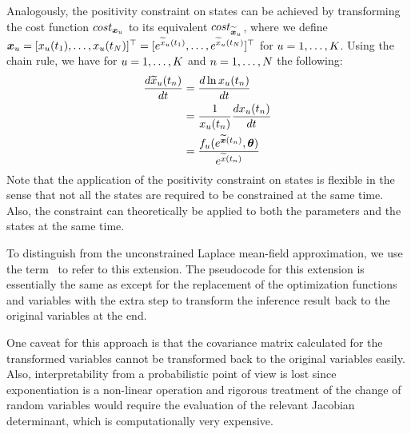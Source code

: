 Analogously, the positivity constraint on states can be achieved by transforming the cost function $cost_{\boldsymbol{x}_{u}}$ to its equivalent $cost_{\boldsymbol{\widetilde{x}}_{u}}$, where we define $\boldsymbol{x}_{u} = [x_{u}(t_{1}),\dots,x_{u}(t_{N})]^\top = [e^{\widetilde{x}_{u}(t_{1})},\dots,e^{\widetilde{x}_{u}(t_{N})}]^\top$ for $u = 1,\dots,K$.
Using the chain rule, we have for $u = 1,\dots,K$ and $n = 1,\dots,N$ the following:
\begin{align}
    \frac{d\widetilde{x}_{u}(t_n)}{dt}
    & =
    \frac{d\ln{{x}_{u}(t_n)}}{dt}
    \nonumber
    \\
    & =
    \frac{1}{{x}_{u}(t_n)}\frac{d{x}_{u}(t_n)}{dt}
    \nonumber
    \\
    & =  
    \frac{
        f_{u}(
        e^{\boldsymbol{\widetilde{x}}(t_n)}, \boldsymbol{\theta})}{e^{\widetilde{x}(t_n)}}
\end{align}
Note that the application of the positivity constraint on states is flexible in the sense that not all the states are required to be constrained at the same time.
Also, the constraint can theoretically be applied to both the parameters and the states at the same time.

To distinguish from the unconstrained Laplace mean-field approximation, we use the term \algolpmfpos\ to refer to this extension.
The pseudocode for this extension is essentially the same as  except for the replacement of the optimization functions and variables with the extra step to transform the inference result back to the original variables at the end.

One caveat for this approach is that the covariance matrix calculated for the transformed variables cannot be transformed back to the original variables easily.
Also, interpretability from a probabilistic point of view is lost since exponentiation is a non-linear operation and rigorous treatment of the change of random variables would require the evaluation of the relevant Jacobian determinant, which is computationally very expensive.
